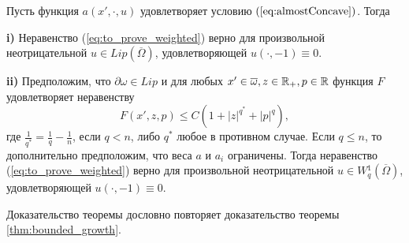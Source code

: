 \begin{thm}
Пусть функция $a(x', \cdot, u)$ удовлетворяет условию $(\ref{eq:almostConcave})$.
Тогда

\textbf{\textup{i)}} Неравенство (\ref{eq:to_prove_weighted}) верно для произвольной неотрицательной $u \in Lip(\overline{\Omega})$,
удовлетворяющей $u(\cdot, -1) \equiv 0$.

\textbf{\textup{ii)}} Предположим, что $\partial \omega \in Lip$ и
для любых $x' \in \overline{\omega}, z \in \Real_+, p \in \Real$
функция $F$ удовлетворяет неравенству
$$F( x', z, p ) \le C ( 1 + |z|^{q^*} + |p|^q ),$$
где $\frac{1}{q^*} = \frac{1}{q} - \frac{1}{n}$, если $q < n$, либо $q^*$ любое в противном случае.
Если $q \le n$, то дополнительно предположим, что веса $a$ и $a_i$ ограничены.
Тогда неравенство (\ref{eq:to_prove_weighted}) верно для произвольной неотрицательной $u \in W{}^1_q(\overline{\Omega})$,
удовлетворяющей $u(\cdot, -1) \equiv 0$.
\end{thm}

Доказательство теоремы дословно повторяет доказательство теоремы \ref{thm:bounded_growth}.
